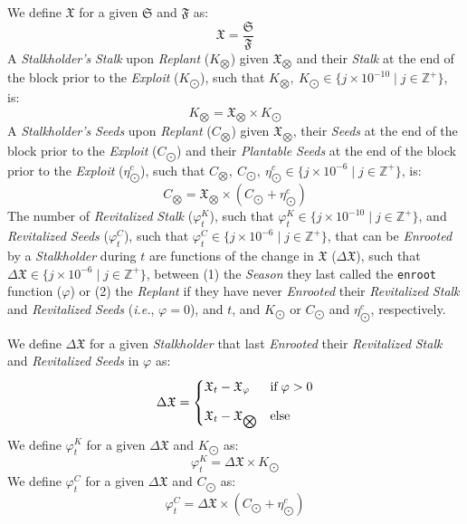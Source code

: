\documentclass[tikz]{article}
\newcommand{\code}[1]{\texttt{#1}}
\newcommand{\term}[1]{\textsl{#1}}
\begin{document}
We define $\mathfrak{X}$ for a given $\mathfrak{S}$ and $\mathfrak{F}$ as:
$$\mathfrak{X} = \frac{\mathfrak{S}}{\mathfrak{F}}$$
A \term{Stalkholder's} \term{Stalk} upon \term{Replant} ($K_{\bigotimes}$) given $\mathfrak{X}_{\bigotimes}$ and their \term{Stalk} at the end of the block prior to the \term{Exploit} ($K_{\bigodot}$), such that $K_{\bigotimes},\ K_{\bigodot} \in \{j \times 10^{-10} \mid j \in \mathbb{Z}^{+} \}$, is:
$$K_{\bigotimes} = \mathfrak{X}_{\bigotimes} \times K_{\bigodot}$$
A \term{Stalkholder's} \term{Seeds} upon \term{Replant} ($C_{\bigotimes}$) given $\mathfrak{X}_{\bigotimes}$, their \term{Seeds} at the end of the block prior to the \term{Exploit} ($C_{\bigodot}$) and their \term{Plantable} \term{Seeds} at the end of the block prior to the \term{Exploit} ($\eta_{\bigodot}^c$), such that $C_{\bigotimes},\ C_{\bigodot},\ \eta_{\bigodot}^c \in \{j \times 10^{-6} \mid j \in \mathbb{Z}^{+} \}$, is:
$$C_{\bigotimes} = \mathfrak{X}_{\bigotimes} \times (C_{\bigodot} + \eta_{\bigodot}^c)$$
The number of \term{Revitalized} \term{Stalk} (${\varphi}_t^K$), such that ${\varphi}_t^K \in \{j \times 10^{-10} \mid j \in \mathbb{Z}^{+} \}$, and \term{Revitalized} \term{Seeds} (${\varphi}_t^C$), such that ${\varphi}_t^C \in \{j \times 10^{-6} \mid j \in \mathbb{Z}^{+} \}$, that can be \term{Enrooted} by a \term{Stalkholder} during $t$ are functions of the change in $\mathfrak{X}$ ($\Delta \mathfrak{X}$), such that $\Delta \mathfrak{X} \in \{j \times 10^{-6} \mid j \in \mathbb{Z}^{+} \}$, between (1) the \term{Season} they last called the \code{enroot} function ($\varphi$) or (2) the \term{Replant} if they have never \term{Enrooted} their \term{Revitalized} \term{Stalk} and \term{Revitalized} \term{Seeds} (\term{i.e.}, $\varphi = 0$), and $t$, and $K_{\bigodot}$ or $C_{\bigodot}$ and $\eta_{\bigodot}^c$, respectively. 

We define $\Delta \mathfrak{X}$ for a given \term{Stalkholder} that last \term{Enrooted} their \term{Revitalized} \term{Stalk} and \term{Revitalized} \term{Seeds} in $\varphi$ as:
$$\Delta \mathfrak{X} = \begin{cases} \mathfrak{X}_{t} - \mathfrak{X}_\varphi & \text{if} \; \varphi > 0 \vspace{.3cm} \\ 
\mathfrak{X}_{t} - \mathfrak{X}_{\bigotimes} & \text{else}\end{cases}$$
We define ${\varphi}_t^K$ for a given $\Delta \mathfrak{X}$ and $K_{\bigodot}$ as:
$${\varphi}_t^K = \Delta \mathfrak{X} \times K_{\bigodot}$$
We define ${\varphi}_t^C$ for a given $\Delta \mathfrak{X}$ and $C_{\bigodot}$ as:
$${\varphi}_t^C = \Delta \mathfrak{X} \times (C_{\bigodot} + \eta_{\bigodot}^c)$$
\end{document}
